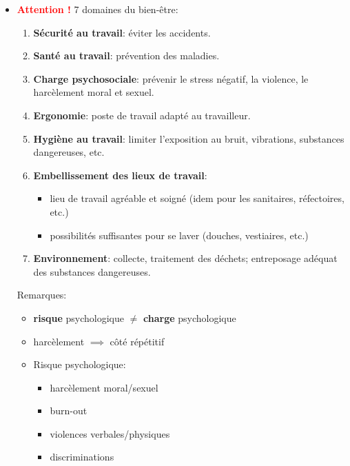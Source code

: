 \documentclass[a4paper]{article}
\begin{document}
\begin{itemize}
\item \textcolor{red}{\textbf{Attention !}} 7 domaines du bien-être:
\begin{enumerate}
    \item \textbf{Sécurité au travail}: éviter les accidents.
    \item \textbf{Santé au travail}: prévention des maladies.
    \item \textbf{Charge psychosociale}: prévenir le stress négatif, la violence, le harcèlement moral et sexuel.
    \item \textbf{Ergonomie}: poste de travail adapté au travailleur.
    \item \textbf{Hygiène au travail}: limiter l'exposition au bruit, vibrations, substances dangereuses, etc.
    \item \textbf{Embellissement des lieux de travail}:
    \begin{itemize}
        \item lieu de travail agréable et soigné (idem pour les sanitaires, réfectoires, etc.)
        \item possibilités suffisantes pour se laver (douches, vestiaires, etc.)
    \end{itemize}
    \item \textbf{Environnement}: collecte, traitement des déchets; entreposage adéquat des substances dangereuses.
\end{enumerate}
Remarques:
\begin{itemize}
    \item \textbf{risque} psychologique $ \neq $ \textbf{charge} psychologique
    \item harcèlement $ \implies $ côté répétitif
    \item Risque psychologique:
    \begin{itemize}
        \item harcèlement moral/sexuel
        \item burn-out
        \item violences verbales/physiques
        \item discriminations
    \end{itemize}
\end{itemize}






\end{itemize}
\end{document}
